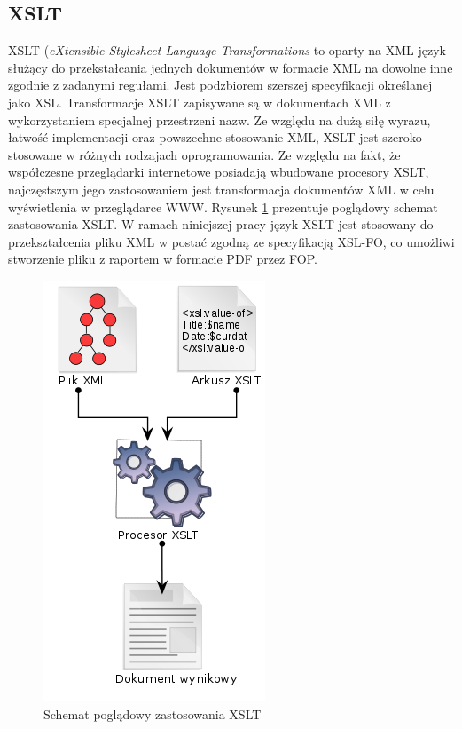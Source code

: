 \documentclass[11pt,a4paper]{article}
\begin{document}
\subsection{XSLT} \label{tools:xslt}
XSLT (\emph{eXtensible Stylesheet Language Transformations} to oparty na XML język służący do przekstałcania jednych dokumentów w formacie XML na dowolne inne zgodnie z zadanymi regułami. Jest podzbiorem szerszej specyfikacji określanej jako XSL. Transformacje XSLT zapisywane są w dokumentach XML z wykorzystaniem specjalnej przestrzeni nazw. Ze względu na dużą siłę wyrazu, łatwość implementacji oraz powszechne stosowanie XML, XSLT jest szeroko stosowane w różnych rodzajach oprogramowania. Ze względu na fakt, że współczesne przeglądarki internetowe posiadają wbudowane procesory XSLT, najczęstszym jego zastosowaniem jest transformacja dokumentów XML w celu wyświetlenia w przeglądarce WWW. Rysunek \ref{img:xslt} prezentuje poglądowy schemat zastosowania XSLT. W ramach niniejszej pracy język XSLT jest stosowany do przekształcenia pliku XML w postać zgodną ze specyfikacją XSL-FO, co umożliwi stworzenie pliku z raportem w formacie PDF przez FOP.
\begin{figure}[h]
\centering
\includegraphics[scale=0.5]{xslt}
\caption{Schemat poglądowy zastosowania XSLT}
\label{img:xslt}
\end{figure}
\end{document}

